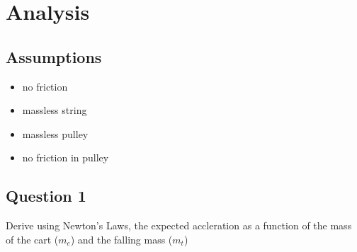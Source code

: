 \documentclass[12pt]{article}
\begin{document}
\begin{figure}[H]
	\centering
\end{figure}




\section{Analysis}

\subsection{Assumptions}
\begin{itemize}
\item no friction
\item massless string
\item massless pulley
\item no friction in pulley
\end{itemize}

\pagebreak

\subsection{Question 1}
Derive using Newton's Laws, the expected accleration as a function of the mass of the cart ($m_{c}$) and the falling mass ($m_{t}$)
\end{document}
